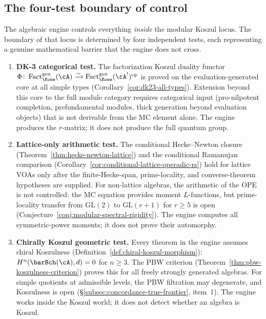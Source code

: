 \subsection{The four-test boundary of control}
\label{subsec:concordance-four-test-boundary}

The algebraic engine controls everything
\emph{inside} the modular Koszul locus. The boundary
of that locus is determined by four independent tests,
each representing a genuine mathematical barrier that the
engine does not cross.

\begin{enumerate}
\item \textbf{DK-3 categorical test.}
 The factorization Koszul duality functor
 $\Phi \colon \operatorname{Fact}_{\Eone}^{\mathrm{gen}}
 (\cA) \xrightarrow{\sim}
 \operatorname{Fact}_{\Eone}^{\mathrm{gen}}
 (\cA^!)^{\mathrm{op}}$
 is proved on the evaluation-generated core at all simple
 types
 (Corollary~\ref{cor:dk23-all-types}).
 Extension beyond this core to the full module category
 requires categorical input (pro-nilpotent completion,
 prefundamental modules, thick generation beyond evaluation
 objects) that is not derivable from the MC element alone.
 The engine produces the $r$-matrix; it does not produce
 the full quantum group.

\item \textbf{Lattice-only arithmetic test.}
 The conditional Hecke--Newton closure
 (Theorem~\ref{thm:hecke-newton-lattice}) and the
 conditional Ramanujan comparison
 (Corollary~\ref{cor:conditional-lattice-operadic-rs}) hold
 for lattice VOAs only after the finite-Hecke-span,
 prime-locality, and converse-theorem hypotheses are supplied.
 For non-lattice algebras, the arithmetic of the OPE is
 not controlled: the MC equation provides moment
 $L$-functions, but prime-locality transfer from
 $\mathrm{GL}(2)$ to $\mathrm{GL}(r+1)$ for $r \geq 5$
 is open
 (Conjecture~\ref{conj:modular-spectral-rigidity}).
 The engine computes all symmetric-power moments; it does
 not prove their automorphy.

\item \textbf{Chirally Koszul geometric test.}
 Every theorem in the engine assumes chiral Koszulness
 (Definition~\ref{def:chiral-koszul-morphism}):
 $H^n(\barBch(\cA), d) = 0$ for $n \geq 3$.
 The PBW criterion
 (Theorem~\ref{thm:pbw-koszulness-criterion}) proves this
 for all freely strongly generated algebras.
 For simple quotients at admissible levels, the PBW
 filtration may degenerate, and Koszulness is open
 (\S\ref{subsec:concordance-true-frontier}, item~1).
 The engine works inside the Koszul world; it does not
 detect whether an algebra is Koszul.


\end{enumerate}
